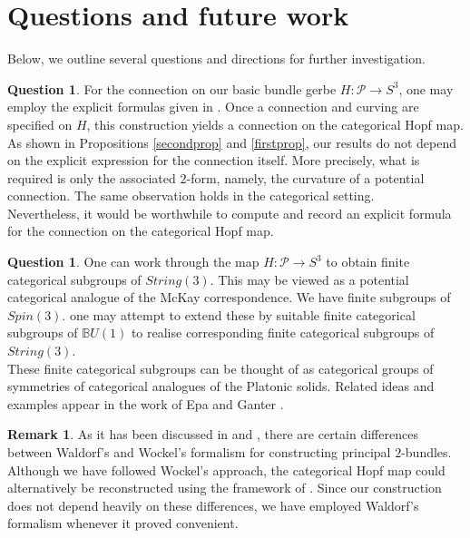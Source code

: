 \documentclass{article}
\theoremstyle{plain}
\theoremstyle{definition}
\newtheorem{rem}[thm]{Remark}
\newtheorem{ques}[thm]{Question}
\begin{document}
\section{Questions and future work}
Below, we outline several questions and directions for further investigation.
\begin{ques}
For the connection on our basic bundle gerbe $H:\mathcal{P} \longrightarrow S^3$, one may employ the explicit formulas given in \cite{MR3894086}. Once a connection and curving are specified on $H$, this construction yields a connection on the categorical Hopf map. As shown in Propositions \ref{secondprop} and \ref{firstprop}, our results do not depend on the explicit expression for the connection itself. More precisely, what is required is only the associated $2$-form, namely, the curvature of a potential connection. The same observation holds in the categorical setting. \\
Nevertheless, it would be worthwhile to compute and record an explicit formula for the connection on the categorical Hopf map.
\end{ques}
\begin{ques}
One can work through the map $H:\mathcal{P} \longrightarrow S^3$ to obtain finite categorical subgroups of $String(3)$. This may be viewed as a potential categorical analogue of the McKay correspondence. We have finite subgroups of $Spin(3)$. one may attempt to extend these by suitable finite categorical subgroups of $\mathbb{B}U(1)$ to realise corresponding finite categorical subgroups of $String(3)$. \\
These finite categorical subgroups can be thought of as categorical groups of symmetries of categorical analogues of the Platonic solids. Related ideas and examples appear in the work of Epa and Ganter \cite{MR3912053}.  
\end{ques}
\begin{rem}
As it has been discussed in \cite{MR3089401} and \cite{MR2805195}, there are certain differences between Waldorf's and Wockel's formalism for constructing principal $2$-bundles. Although we have followed Wockel's approach, the categorical Hopf map could alternatively be reconstructed using the framework of \cite{MR3089401}. Since our construction does not depend heavily on these differences, we have employed Waldorf’s formalism whenever it proved convenient.
\end{rem}
\end{document}
